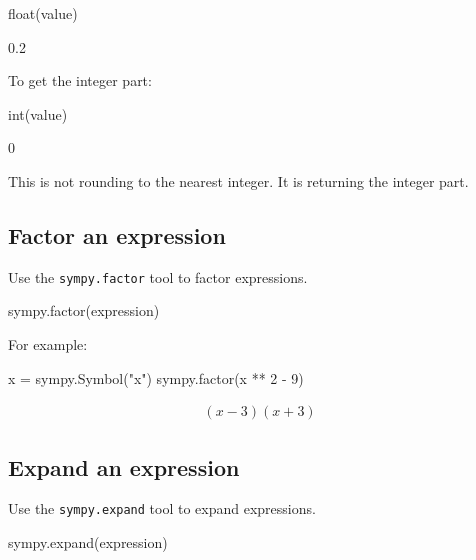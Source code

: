 \begin{pyin}
float(value)
\end{pyin}





\begin{raw}
0.2
\end{raw}





To get the integer part:




\begin{pyin}
int(value)
\end{pyin}

\begin{raw}
0
\end{raw}

\begin{note}
This is not rounding to the nearest integer. It is returning the integer part.
\end{note}


\subsection{Factor an expression}

Use the \texttt{sympy.factor} tool to factor expressions.

\begin{pyin}
sympy.factor(expression)
\end{pyin}

For example:

\begin{pyin}
x = sympy.Symbol("x")
sympy.factor(x ** 2 - 9)
\end{pyin}


\begin{equation*}
\begin{split}\displaystyle \left(x - 3\right) \left(x + 3\right)\end{split}
\end{equation*}

\subsection{Expand an expression}

Use the \texttt{sympy.expand} tool to expand expressions.

\begin{pyin}
sympy.expand(expression)
\end{pyin}


